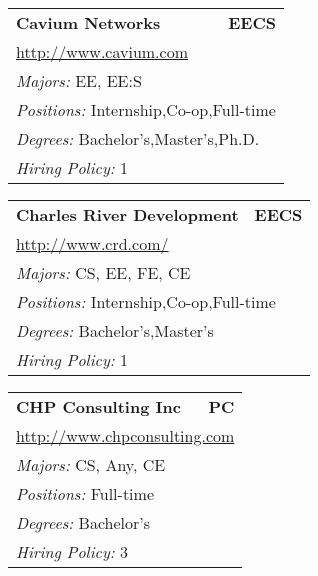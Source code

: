 \documentclass[twoside]{article}
\begin{document}
\begin{center}
\begin{multicols}{3}
\begin{FlushLeft}
\begin{minipage}{.9\columnwidth}
\end{minipage}
 
\begin{minipage}{.9\columnwidth}\begin{tabularx}{.95\columnwidth}{Xr}
                 {\Large\bf Cavium Networks} & {\Large\bf EECS}\\
    \multicolumn{2}{p{.95\columnwidth}}{\url{http://www.cavium.com}}\\
    \multicolumn{2}{p{.95\columnwidth}}{\emph{Majors:} EE, EE:S}\\
    \multicolumn{2}{p{.95\columnwidth}}{\emph{Positions:} Internship,Co-op,Full-time}\\
    \multicolumn{2}{p{.95\columnwidth}}{\emph{Degrees:} Bachelor's,Master's,Ph.D.}\\
    \multicolumn{2}{p{.95\columnwidth}}{\emph{Hiring Policy:} 1}\\
    \end{tabularx}
    
\end{minipage}
 
\begin{minipage}{.9\columnwidth}\begin{tabularx}{.95\columnwidth}{Xr}
                 {\Large\bf Charles River Development} & {\Large\bf EECS}\\
    \multicolumn{2}{p{.95\columnwidth}}{\url{http://www.crd.com/}}\\
    \multicolumn{2}{p{.95\columnwidth}}{\emph{Majors:} CS, EE, FE, CE}\\
    \multicolumn{2}{p{.95\columnwidth}}{\emph{Positions:} Internship,Co-op,Full-time}\\
    \multicolumn{2}{p{.95\columnwidth}}{\emph{Degrees:} Bachelor's,Master's}\\
    \multicolumn{2}{p{.95\columnwidth}}{\emph{Hiring Policy:} 1}\\
    \end{tabularx}
    
\end{minipage}
 
\begin{minipage}{.9\columnwidth}\begin{tabularx}{.95\columnwidth}{Xr}
                 {\Large\bf CHP Consulting Inc} & {\Large\bf PC}\\
    \multicolumn{2}{p{.95\columnwidth}}{\url{http://www.chpconsulting.com}}\\
    \multicolumn{2}{p{.95\columnwidth}}{\emph{Majors:} CS, Any, CE}\\
    \multicolumn{2}{p{.95\columnwidth}}{\emph{Positions:} Full-time}\\
    \multicolumn{2}{p{.95\columnwidth}}{\emph{Degrees:} Bachelor's}\\
    \multicolumn{2}{p{.95\columnwidth}}{\emph{Hiring Policy:} 3}\\
    \end{tabularx}
    

\end{minipage}
\end{FlushLeft}
\end{multicols}
\end{center}
\end{document}
